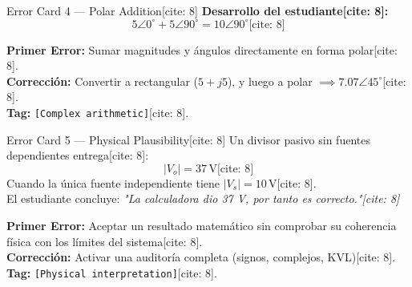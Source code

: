 \documentclass[aspectratio=169]{beamer}
\begin{document}
\begin{frame}{Error Card 4 — Polar Addition[cite: 8]}
    \textbf{Desarrollo del estudiante[cite: 8]:}
    \begin{equation*}
        5\angle0^\circ + 5\angle90^\circ = 10\angle90^\circ \text{[cite: 8]}
    \end{equation*}

    \vspace{0.3cm}
    \pause
    \begin{tcolorbox}[colback=red!5, colframe=red!70!black, title=\textbf{Diagnóstico}, width=\linewidth]
        \textbf{Primer Error:} Sumar magnitudes y ángulos directamente en forma polar[cite: 8]. \\
        \textbf{Corrección:} Convertir a rectangular ($5 + j5$), y luego a polar $\implies 7.07\angle45^\circ$[cite: 8]. \\
        \textbf{Tag:} \texttt{[Complex arithmetic]}[cite: 8].
    \end{tcolorbox}
\end{frame}

\begin{frame}{Error Card 5 — Physical Plausibility[cite: 8]}
    Un divisor pasivo sin fuentes dependientes entrega[cite: 8]:
    \begin{equation*}
        |V_o| = 37\,\text{V} \text{[cite: 8]}
    \end{equation*}
    Cuando la única fuente independiente tiene $|V_s| = 10\,\text{V}$[cite: 8]. \\
    El estudiante concluye: \textit{"La calculadora dio 37 V, por tanto es correcto."[cite: 8]}

    \vspace{0.3cm}
    \pause
    \begin{tcolorbox}[colback=red!5, colframe=red!70!black, title=\textbf{Diagnóstico}, width=\linewidth]
        \textbf{Primer Error:} Aceptar un resultado matemático sin comprobar su coherencia física con los límites del sistema[cite: 8]. \\
        \textbf{Corrección:} Activar una auditoría completa (signos, complejos, KVL)[cite: 8]. \\
        \textbf{Tag:} \texttt{[Physical interpretation]}[cite: 8].
    \end{tcolorbox}
\end{frame}
\end{document}

